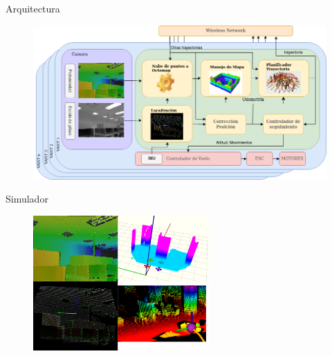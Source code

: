 \documentclass[
  24pt, %
  aspectratio=169, %
]{beamer}
\begin{document}
\begin{frame}{Arquitectura}
  \begin{figure}
    \centering
    \includegraphics[width=15cm]{arquitectura}
  \end{figure}
\end{frame}

\begin{frame}{Simulador}
  \begin{figure}
    \centering
    \includegraphics[width=0.6\textwidth]{visual}
  \end{figure}
\end{frame}
\end{document}
